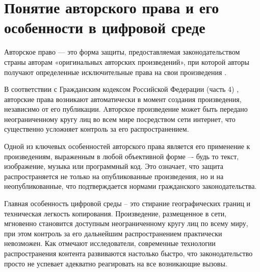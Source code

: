 
\section{Понятие авторского права и его особенности в цифровой среде}

Авторское право — это форма защиты, предоставляемая законодательством страны авторам «оригинальных авторских произведений», при которой авторы получают определенные исключительные права на свои произведения \cite{boichenko}.

В соответствии с Гражданским кодексом Российской Федерации (часть 4) \cite{gkRF4},
авторские права возникают автоматически в момент создания произведения, независимо от его
публикации. Aвторское произведение может быть передано неограниченному кругу лиц во всем
мире посредством сети интернет, что существенно усложняет контроль за его
распространением.

Одной из ключевых особенностей авторского права является его применение к произведениям,
выраженным в любой объективной форме –- будь то текст, изображение, музыка или
программный код. Это означает, что защита распространяется не только на опубликованные
произведения, но и на неопубликованные, что подтверждается нормами гражданского
законодательства.

Главная особенность цифровой среды -- это стирание географических границ и техническая
легкость копирования. Произведение, размещенное в сети, мгновенно становится доступным
неограниченному кругу лиц по всему миру, при этом контроль за его дальнейшим
распространением практически невозможен. Как отмечают исследователи, современные
технологии распространения контента развиваются настолько быстро, что законодательство
просто не успевает адекватно реагировать на все возникающие вызовы.

